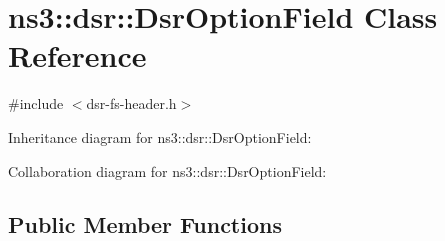 \hypertarget{classns3_1_1dsr_1_1DsrOptionField}{}\section{ns3\+:\+:dsr\+:\+:Dsr\+Option\+Field Class Reference}
\label{classns3_1_1dsr_1_1DsrOptionField}


{\ttfamily \#include $<$dsr-\/fs-\/header.\+h$>$}



Inheritance diagram for ns3\+:\+:dsr\+:\+:Dsr\+Option\+Field\+:


Collaboration diagram for ns3\+:\+:dsr\+:\+:Dsr\+Option\+Field\+:
\subsection*{Public Member Functions}
